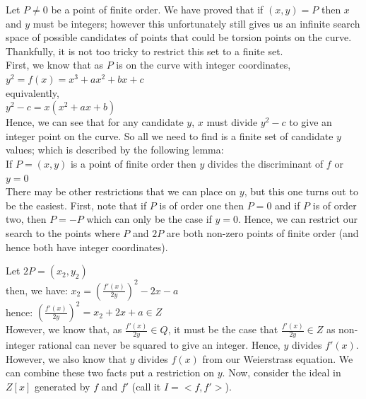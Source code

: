 \documentclass{article}
\begin{document}
Let $P \neq 0$ be a point of finite order. We have proved that if $(x, y) = P$ then $x$ and $y$ must be integers; however this unfortunately still gives us an infinite search space of possible candidates of points that could be torsion points on the curve. Thankfully, it is not too tricky to restrict this set to a finite set.\\

First, we know that as $P$ is on the curve with integer coordinates, \\

$y^2 = f(x) = x^3 + a x^2 + b x + c$\\

equivalently,\\

$y^2 - c = x(x^2 + a x + b)$\\

Hence, we can see that for any candidate $y$, $x$ must divide $y^2 - c$ to give an integer point on the curve. So all we need to find is a finite set of candidate $y$ values; which is described by the following lemma:\\

If $P = (x, y)$ is a point of finite order then $y$ divides the discriminant of $f$ or $y = 0$\\

There may be other restrictions that we can place on $y$, but this one turns out to be the easiest. First, note that if $P$ is of order one then $P = 0$ and if $P$ is of order two, then $P = -P$ which can only be the case if $y = 0$. Hence, we can restrict our search to the points where $P$ and $2P$ are both non-zero points of finite order (and hence both have integer coordinates).

Let $2P = (x_2, y_2)$\\

then, we have: $x_2 = (\frac{f'(x)}{2y})^2 - 2x - a$\\

hence: $(\frac{f'(x)}{2y})^2 = x_2 + 2x + a \in Z$\\

However, we know that, as $\frac{f'(x)}{2y} \in Q$, it must be the case that $\frac{f'(x)}{2y} \in Z$ as non-integer rational can never be squared to give an integer. Hence, $y$ divides $f'(x)$. However, we also know that $y$ divides $f(x)$ from our Weierstrass equation. We can combine these two facts put a restriction on $y$. Now, consider the ideal in $Z[x]$ generated by $f$ and $f'$ (call it $I = <f, f'>$).\\
\end{document}
